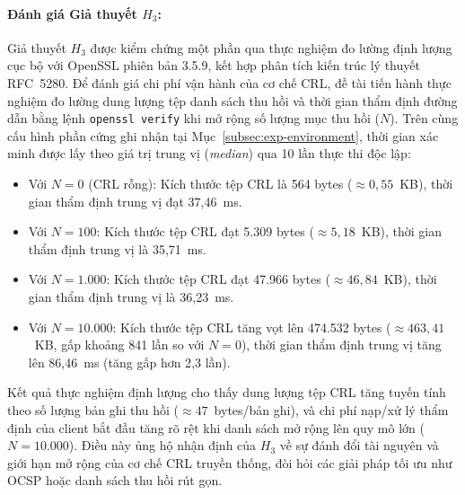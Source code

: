 \paragraph{Đánh giá Giả thuyết $H_3$:}
Giả thuyết $H_3$ được kiểm chứng một phần qua thực nghiệm đo lường định lượng cục bộ với OpenSSL phiên bản 3.5.9, kết hợp phân tích kiến trúc lý thuyết RFC~5280. Để đánh giá chi phí vận hành của cơ chế CRL, đề tài tiến hành thực nghiệm đo lường dung lượng tệp danh sách thu hồi và thời gian thẩm định đường dẫn bằng lệnh \texttt{openssl verify} khi mở rộng số lượng mục thu hồi ($N$). Trên cùng cấu hình phần cứng ghi nhận tại Mục~\ref{subsec:exp-environment}, thời gian xác minh được lấy theo giá trị trung vị (\textit{median}) qua 10 lần thực thi độc lập:
\begin{itemize}
    \item Với $N = 0$ (CRL rỗng): Kích thước tệp CRL là 564 bytes ($\approx 0{,}55$~KB), thời gian thẩm định trung vị đạt 37{,}46~ms.
    \item Với $N = 100$: Kích thước tệp CRL đạt 5.309 bytes ($\approx 5{,}18$~KB), thời gian thẩm định trung vị là 35{,}71~ms.
    \item Với $N = 1.000$: Kích thước tệp CRL đạt 47.966 bytes ($\approx 46{,}84$~KB), thời gian thẩm định trung vị là 36{,}23~ms.
    \item Với $N = 10.000$: Kích thước tệp CRL tăng vọt lên 474.532 bytes ($\approx 463{,}41$~KB, gấp khoảng 841 lần so với $N=0$), thời gian thẩm định trung vị tăng lên 86{,}46~ms (tăng gấp hơn 2{,}3 lần).
\end{itemize}
Kết quả thực nghiệm định lượng cho thấy dung lượng tệp CRL tăng tuyến tính theo số lượng bản ghi thu hồi ($\approx 47$~bytes/bản ghi), và chi phí nạp/xử lý thẩm định của client bắt đầu tăng rõ rệt khi danh sách mở rộng lên quy mô lớn ($N = 10.000$). Điều này ủng hộ nhận định của $H_3$ về sự đánh đổi tài nguyên và giới hạn mở rộng của cơ chế CRL truyền thống, đòi hỏi các giải pháp tối ưu như OCSP hoặc danh sách thu hồi rút gọn.

